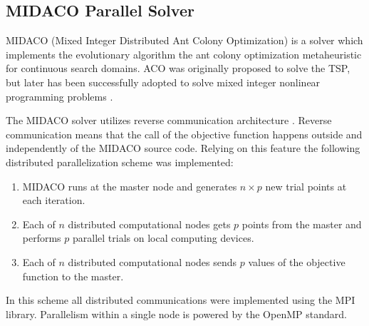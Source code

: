 \documentclass{svproc}
\begin{document}
\subsection{MIDACO Parallel Solver}
MIDACO (Mixed Integer Distributed Ant Colony Optimization) \cite{Schlueter2012} is a solver
which implements the evolutionary algorithm
the ant colony optimization metaheuristic for continuous search domains. ACO was originally
proposed to solve the TSP, but later has been successfully adopted to solve mixed integer nonlinear
programming problems \cite{SCHLUTER2009}.

The MIDACO solver utilizes reverse communication architecture \cite{Schlueter2012}.
Reverse communication means that the call of the objective function happens outside and
independently of the MIDACO source code.
Relying on this feature the following distributed parallelization scheme was implemented:
\begin{enumerate}
  \item MIDACO runs at the master node and generates \(n \times p\) new trial points at each
iteration.
  \item Each of \(n\) distributed computational nodes gets \(p\) points from the master and performs
\(p\) parallel trials on local computing devices.
  \item Each of \(n\) distributed computational nodes sends \(p\) values of the objective function to
the master.
\end{enumerate}

In this scheme all distributed communications were implemented using the MPI library.
Parallelism within a single node is powered by the OpenMP standard.
\end{document}
